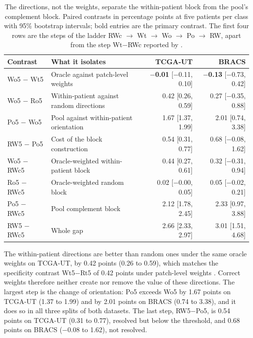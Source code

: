 \begin{table}[htbp]
\centering
\small
\renewcommand{\arraystretch}{1.15}
\begin{tabular}{@{}llrr@{}}
\toprule
Contrast & What it isolates & TCGA-UT & BRACS \\
\midrule
Wo5 $-$ Wt5 & Oracle against patch-level weights & \textbf{$-$0.01} [$-$0.11, 0.10] & \textbf{$-$0.13} [$-$0.73, 0.42] \\
Wo5 $-$ Ro5 & Within-patient against random directions & 0.42 [0.26, 0.59] & 0.27 [$-$0.35, 0.88] \\
Po5 $-$ Wo5 & Pool against within-patient orientation & 1.67 [1.37, 1.99] & 2.01 [0.74, 3.38] \\
RW5 $-$ Po5 & Cost of the block construction & 0.54 [0.31, 0.77] & 0.68 [$-$0.08, 1.62] \\
\addlinespace
Wo5 $-$ RWc5 & Oracle-weighted within-patient block & 0.44 [0.27, 0.61] & 0.32 [$-$0.31, 0.94] \\
Ro5 $-$ RWc5 & Oracle-weighted random block & 0.02 [$-$0.00, 0.05] & 0.05 [$-$0.02, 0.21] \\
Po5 $-$ RWc5 & Pool complement block & 2.12 [1.78, 2.45] & 2.33 [0.97, 3.88] \\
RW5 $-$ RWc5 & Whole gap & 2.66 [2.33, 2.97] & 3.01 [1.51, 4.68] \\
\bottomrule
\end{tabular}
\caption{The directions, not the weights, separate the within-patient block from the pool's complement block. Paired contrasts in percentage points at five patients per class with 95\% bootstrap intervals; bold entries are the primary contrast. The first four rows are the steps of the ladder RWc $\to$ Wt $\to$ Wo $\to$ Po $\to$ RW, apart from the step Wt$-$RWc reported by \citet{queisler2026withinPatientSpan}.}
\label{tab:contrasts}
\end{table}

\noindent The within-patient directions are better than random ones under the same oracle weights on TCGA-UT, by 0.42 points (0.26 to 0.59), which matches the specificity contrast Wt5$-$Rt5 of 0.42 points under patch-level weights \citep{queisler2026withinPatientSpan}. Correct weights therefore neither create nor remove the value of these directions. The largest step is the change of orientation: Po5 exceeds Wo5 by 1.67 points on TCGA-UT (1.37 to 1.99) and by 2.01 points on BRACS (0.74 to 3.38), and it does so in all three splits of both datasets. The last step, RW5$-$Po5, is 0.54 points on TCGA-UT (0.31 to 0.77), resolved but below the threshold, and 0.68 points on BRACS ($-0.08$ to 1.62), not resolved.


